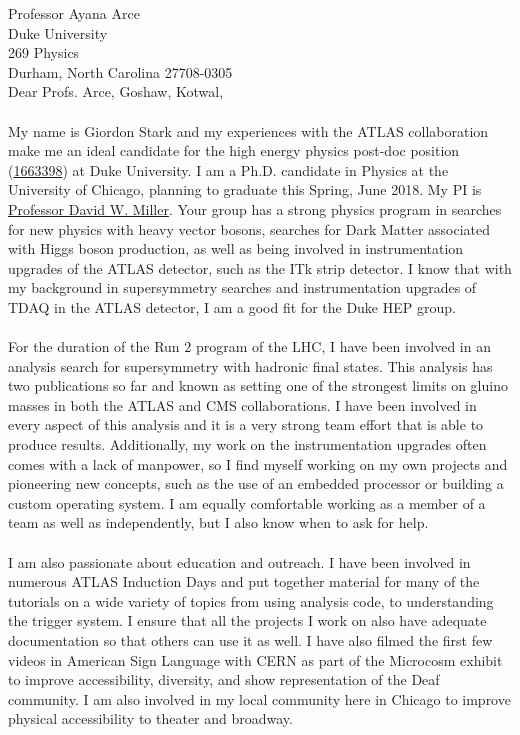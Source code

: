 \documentclass[11pt,letter]{article}
\begin{document}
\thispagestyle{fancy}

Professor Ayana Arce \\
Duke University \\
269 Physics \\
Durham, North Carolina 27708-0305 \\[0.5cm]

Dear Profs. Arce, Goshaw, Kotwal, \\
\\
My name is Giordon Stark and my experiences with the ATLAS collaboration make me an ideal candidate for the high energy physics post-doc position (\href{https://inspirehep.net/record/1663398}{1663398}) at Duke University. I am a Ph.D. candidate in Physics at the University of Chicago, planning to graduate this Spring, June 2018. My PI is \href{http://hep.uchicago.edu/~DavidMiller/Welcome.html}{Professor David W. Miller}. Your group has a strong physics program in searches for new physics with heavy vector bosons, searches for Dark Matter associated with Higgs boson production, as well as being involved in instrumentation upgrades of the ATLAS detector, such as the ITk strip detector. I know that with my background in supersymmetry searches and instrumentation upgrades of TDAQ in the ATLAS detector, I am a good fit for the Duke HEP group.\\
\\
For the duration of the Run 2 program of the LHC, I have been involved in an analysis search for supersymmetry with hadronic final states. This analysis has two publications so far and known as setting one of the strongest limits on gluino masses in both the ATLAS and CMS collaborations. I have been involved in every aspect of this analysis and it is a very strong team effort that is able to produce results. Additionally, my work on the instrumentation upgrades often comes with a lack of manpower, so I find myself working on my own projects and pioneering new concepts, such as the use of an embedded processor or building a custom operating system. I am equally comfortable working as a member of a team as well as independently, but I also know when to ask for help.\\
\\
I am also passionate about education and outreach. I have been involved in numerous ATLAS Induction Days and put together material for many of the tutorials on a wide variety of topics from using analysis code, to understanding the trigger system. I ensure that all the projects I work on also have adequate documentation so that others can use it as well. I have also filmed the first few videos in American Sign Language with CERN as part of the Microcosm exhibit to improve accessibility, diversity, and show representation of the Deaf community. I am also involved in my local community here in Chicago to improve physical accessibility to theater and broadway. \\
\end{document}
